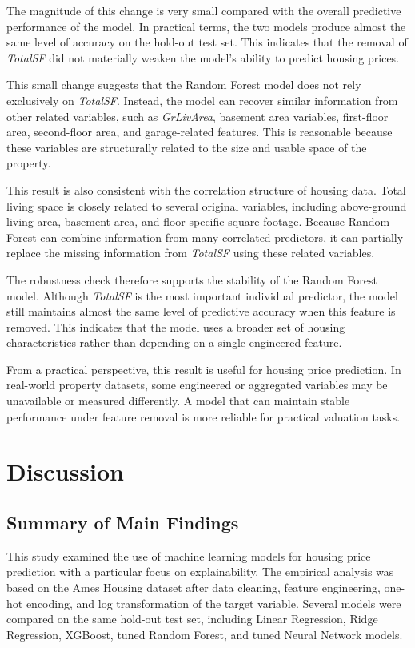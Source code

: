 \documentclass[12pt,a4paper,oneside,openany]{book}
\begin{document}
The magnitude of this change is very small compared with the overall predictive performance of the model. In practical terms, the two models produce almost the same level of accuracy on the hold-out test set. This indicates that the removal of \textit{TotalSF} did not materially weaken the model's ability to predict housing prices.

This small change suggests that the Random Forest model does not rely exclusively on \textit{TotalSF}. Instead, the model can recover similar information from other related variables, such as \textit{GrLivArea}, basement area variables, first-floor area, second-floor area, and garage-related features. This is reasonable because these variables are structurally related to the size and usable space of the property.

This result is also consistent with the correlation structure of housing data. Total living space is closely related to several original variables, including above-ground living area, basement area, and floor-specific square footage. Because Random Forest can combine information from many correlated predictors, it can partially replace the missing information from \textit{TotalSF} using these related variables.

The robustness check therefore supports the stability of the Random Forest model. Although \textit{TotalSF} is the most important individual predictor, the model still maintains almost the same level of predictive accuracy when this feature is removed. This indicates that the model uses a broader set of housing characteristics rather than depending on a single engineered feature.

From a practical perspective, this result is useful for housing price prediction. In real-world property datasets, some engineered or aggregated variables may be unavailable or measured differently. A model that can maintain stable performance under feature removal is more reliable for practical valuation tasks.


\chapter{Discussion}

\section{Summary of Main Findings}

This study examined the use of machine learning models for housing price prediction with a particular focus on explainability. The empirical analysis was based on the Ames Housing dataset after data cleaning, feature engineering, one-hot encoding, and log transformation of the target variable. Several models were compared on the same hold-out test set, including Linear Regression, Ridge Regression, XGBoost, tuned Random Forest, and tuned Neural Network models.
\end{document}
